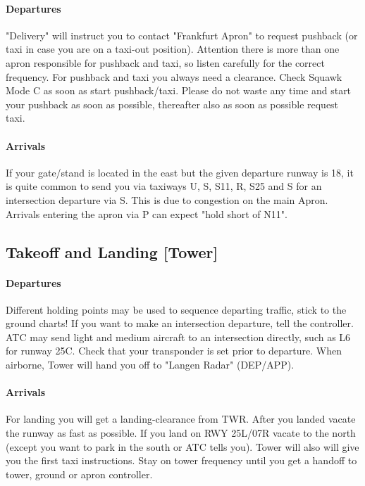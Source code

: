 \paragraph{Departures}
"Delivery" will instruct you to contact "Frankfurt Apron" to request pushback (or taxi in case you are on a taxi-out position). Attention there is more than one apron responsible for pushback and taxi, so listen carefully for the correct frequency.
For pushback and taxi you always need a clearance.
Check Squawk Mode C as soon as start pushback/taxi.
Please do not waste any time and start your pushback as soon as possible, thereafter also as soon as possible request taxi.

\paragraph{Arrivals}
If your gate/stand is located in the east but the given departure runway is 18, it is quite common to send
you via taxiways U, S, S11, R, S25 and S for an intersection departure via S. This is due to congestion on the main Apron.
Arrivals entering the apron via P can expect "hold short of N11".

\subsection[TWR]{Takeoff and Landing [Tower]}

\paragraph{Departures}
Different holding points may be used to sequence departing traffic, stick to the ground charts!
If you want to make an intersection departure, tell the controller. ATC may send light and medium
aircraft to an intersection directly, such as L6 for runway 25C.
Check that your transponder is set prior to departure.
When airborne, Tower will hand you off to "Langen Radar" (DEP/APP). 

\paragraph{Arrivals}
For landing you will get a landing-clearance from TWR.
After you landed vacate the runway as fast as possible.
If you land on RWY 25L/07R vacate to the north (except you want to park in the south or ATC tells you).
Tower will also will give you the first taxi instructions.
Stay on tower frequency until you get a handoff to tower, ground or apron controller.


